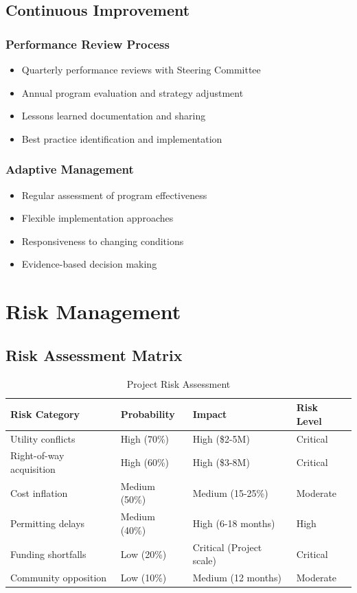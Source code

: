 \documentclass[11pt,letterpaper]{article}
\begin{document}
\subsection{Continuous Improvement}

\subsubsection{Performance Review Process}
\begin{itemize}
    \item Quarterly performance reviews with Steering Committee
    \item Annual program evaluation and strategy adjustment
    \item Lessons learned documentation and sharing
    \item Best practice identification and implementation
\end{itemize}

\subsubsection{Adaptive Management}
\begin{itemize}
    \item Regular assessment of program effectiveness
    \item Flexible implementation approaches
    \item Responsiveness to changing conditions
    \item Evidence-based decision making
\end{itemize}

\section{Risk Management}

\subsection{Risk Assessment Matrix}

\begin{table}[h]
\centering
\caption{Project Risk Assessment}
\begin{tabular}{llll}
\toprule
\textbf{Risk Category} & \textbf{Probability} & \textbf{Impact} & \textbf{Risk Level} \\
\midrule
Utility conflicts & High (70\%) & High (\$2-5M) & Critical \\
Right-of-way acquisition & High (60\%) & High (\$3-8M) & Critical \\
Cost inflation & Medium (50\%) & Medium (15-25\%) & Moderate \\
Permitting delays & Medium (40\%) & High (6-18 months) & High \\
Funding shortfalls & Low (20\%) & Critical (Project scale) & Critical \\
Community opposition & Low (10\%) & Medium (12 months) & Moderate \\
\bottomrule
\end{tabular}
\end{table}
\end{document}
